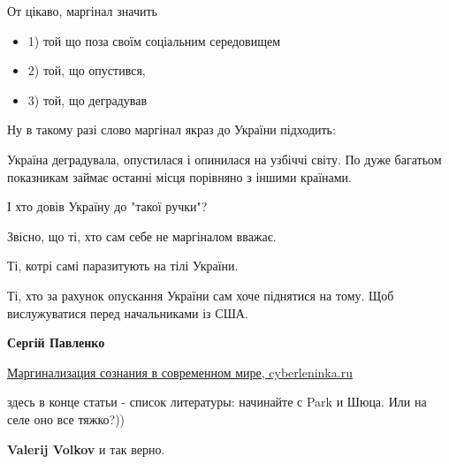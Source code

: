 \begin{itemize}
\begin{itemize}
 

От цікаво, маргінал значить

\begin{itemize}
  \item 1) той що поза своїм соціальним середовищем
  \item 2) той, що опустився,
  \item 3) той, що деградував
\end{itemize}

Ну в такому разі слово маргінал якраз до України підходить:

Україна деградувала, опустилася і опинилася на узбіччі світу. По дуже багатьом
показникам займає останні місця порівняно з іншими країнами.

І хто довів Україну до "такої ручки"?

Звісно, що ті, хто сам себе не маргіналом вважає.

Ті, котрі самі паразитують на тілі України.

Ті, хто за рахунок опускання України сам хоче піднятися на тому. Щоб
вислужуватися перед начальниками із США.

 
\textbf{Сергій Павленко} 

\href{https://cyberleninka.ru/article/n/marginalizatsiya-soznaniya-v-sovremennom-mire/viewer}{%
Маргинализация сознания в современном мире, cyberleninka.ru%
}

здесь в конце статьи - список литературы: начинайте с Park и Шюца. Или на селе
оно все тяжко?))

 
\textbf{Valerij Volkov} и так верно.

 

\end{itemize}
\end{itemize}
